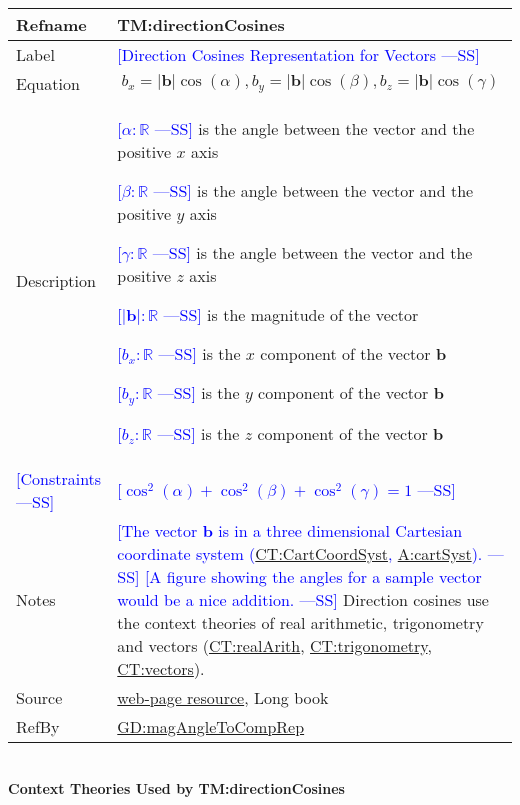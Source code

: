 \documentclass[12pt]{article}
\newcommand{\authornote}[3]{\textcolor{#1}{[#3 ---#2]}}
\newcommand{\authornote}[3]{}
\newcommand{\wss}[1]{\authornote{blue}{SS}{#1}}
\begin{document}
\medskip
\noindent
\begin{minipage}{\textwidth}
\begin{tabular}{>{\raggedright}p{}>{\raggedright\arraybackslash}p{}}
\toprule \textbf{Refname} & \textbf{TM:directionCosines}
\label{TM:directionCosines}
\\ \midrule
Label & \wss{Direction Cosines Representation for Vectors}
\\ \midrule   
Equation & \begin{displaymath}
           b_x = |\symbf{b}| \cos (\alpha), b_y = |\symbf{b}| \cos (\beta), b_z
           = |\symbf{b}| \cos (\gamma)
           \end{displaymath}
\\ \midrule
Description & \begin{symbDescription}
              \item \wss{$\alpha: \mathbb{R}$} is the angle between the vector and the positive $x$ axis 
              \item \wss{$\beta: \mathbb{R}$} is the angle between the vector and the positive $y$ axis 
              \item \wss{$\gamma: \mathbb{R}$} is the angle between the vector and the positive $z$ axis 
              \item \wss{$|\symbf{b}|: \mathbb{R}$} is the magnitude of the vector
              \item \wss{$b_x: \mathbb{R}$} is the $x$ component of the vector $\symbf{b}$
              \item \wss{$b_y: \mathbb{R}$} is the $y$ component of the vector $\symbf{b}$
              \item \wss{$b_z: \mathbb{R}$} is the $z$ component of the vector $\symbf{b}$
              \end{symbDescription}

\\ \midrule
\wss{Constraints} & \wss{$\cos^2(\alpha) + \cos^2(\beta) + \cos^2(\gamma) = 1$}

\\ \midrule
Notes & \wss{The vector $\symbf{b}$ is in a three dimensional Cartesian
coordinate system (\hyperref[CT:CartCoordSyst]{CT:CartCoordSyst},
\hyperref[cartSyst]{A:cartSyst}).}  \wss{A figure showing the angles for a
sample vector would be a nice addition.}  Direction cosines use the context
theories of real arithmetic, trigonometry and vectors
(\hyperref[CT:realArith]{CT:realArith},
\hyperref[CT:trigonometry]{CT:trigonometry}, \hyperref[CT:vectors]{CT:vectors}).

\\ \midrule
Source & \cite{} \href{https://byjus.com/maths/direction-cosines/} {web-page
resource}, Long book 
         
\\ \midrule
RefBy & \hyperref[GD:magAngleToCompRep]{GD:magAngleToCompRep}
        
\\ \bottomrule
\end{tabular}
\end{minipage}
~\\
\noindent \textbf{Context Theories Used by TM:directionCosines}
\end{document}
